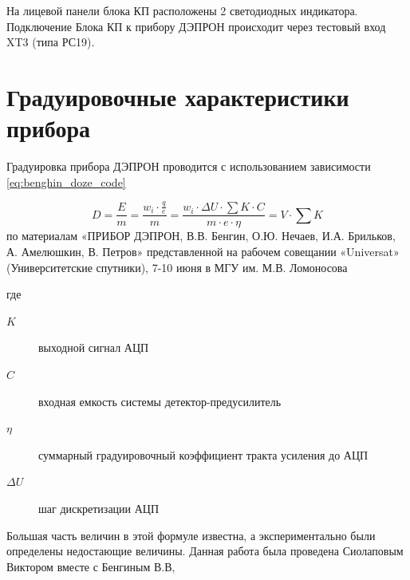 На лицевой панели блока КП расположены 2 светодиодных индикатора. Подключение Блока КП к прибору ДЭПРОН происходит через тестовый вход XT3 (типа РС19).


\section{Градуировочные  характеристики прибора}
Градуировка прибора ДЭПРОН проводится с использованием зависимости \ref{eq:benghin_doze_code}

\begin{equation}\label{eq:benghin_doze_code}
D = \frac{E}{m} = \dfrac{w_i \cdot\frac{q}{e}}{m} = \frac{w_i \cdot \Delta U \cdot\sum K \cdot C}{m \cdot e \cdot \eta}  = V \cdot \sum K
\end{equation}
по материалам  «ПРИБОР ДЭПРОН, В.В. Бенгин, О.Ю. Нечаев, И.А. Брильков, А. Амелюшкин, В. Петров»  представленной на рабочем совещании «Universat» (Университетские спутники), 7-10 июня в МГУ им. М.В. Ломоносова

где \begin{description}	
	\item[$ K $] выходной сигнал АЦП
	\item[$ C $] входная емкость системы детектор-предусилитель
	\item[$ \eta $] суммарный градуировочный коэффициент тракта усиления до АЦП
	\item[$ \Delta U $] шаг дискретизации АЦП
\end{description} 
Большая часть величин в этой формуле известна, а экспериментально были определены недостающие величины. Данная работа была проведена Сиолаповым Виктором вместе с Бенгиным В.В, 
